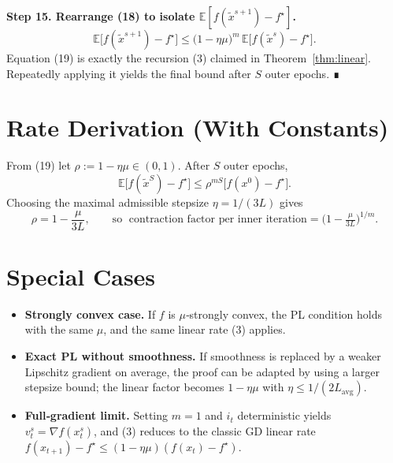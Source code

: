 \documentclass[11pt]{article}
\newcommand{\E}{\mathbb{E}}
\newcommand{\grad}{\nabla}
\begin{document}
\noindent\textbf{Step 15. Rearrange (18) to isolate $\E[f(\tilde{x}^{s+1})-f^{\star}]$.}  
\[
\E\!\bigl[f(\tilde{x}^{s+1})-f^{\star}\bigr]
\le \bigl(1-\eta\mu\bigr)^{m}\,\E\!\bigl[f(\tilde{x}^{s})-f^{\star}\bigr].
\tag{19}
\]  
Equation (19) is exactly the recursion (3) claimed in Theorem~\ref{thm:linear}. Repeatedly applying it yields the final bound after $S$ outer epochs. ∎

\section*{Rate Derivation (With Constants)}
From (19) let $\rho:=1-\eta\mu\in(0,1)$. After $S$ outer epochs,
\[
\E\!\bigl[f(\tilde{x}^{S})-f^{\star}\bigr]\le \rho^{mS}\bigl[f(x^{0})-f^{\star}\bigr].
\]
Choosing the maximal admissible stepsize $\eta=1/(3L)$ gives
\[
\rho = 1-\frac{\mu}{3L},
\qquad
\text{so }\;
\text{contraction factor per inner iteration}
= \bigl(1-\tfrac{\mu}{3L}\bigr)^{1/m}.
\]

\section*{Special Cases}
\begin{itemize}
\item \textbf{Strongly convex case.} If $f$ is $\mu$‑strongly convex, the PL condition holds with the same $\mu$, and the same linear rate (3) applies.
\item \textbf{Exact PL without smoothness.} If smoothness is replaced by a weaker Lipschitz gradient on average, the proof can be adapted by using a larger stepsize bound; the linear factor becomes $1-\eta\mu$ with $\eta\le 1/(2L_{\text{avg}})$.
\item \textbf{Full‑gradient limit.} Setting $m=1$ and $i_t$ deterministic yields $v_{t}^{s}=\grad f(x_{t}^{s})$, and (3) reduces to the classic GD linear rate $f(x_{t+1})-f^{\star}\le (1-\eta\mu)(f(x_{t})-f^{\star})$.
\end{itemize}
\end{document}
